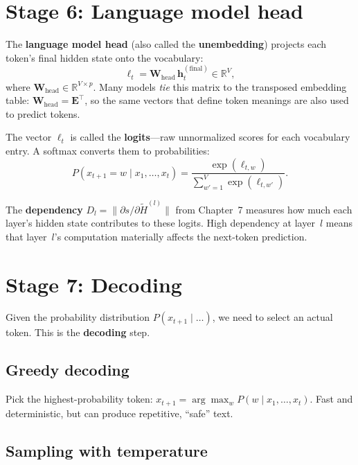 \documentclass[11pt, twoside, openright]{memoir}
\begin{document}
\section{Stage 6: Language model head}

The \textbf{language model head} (also called the \textbf{unembedding})
projects each token's final hidden state onto the vocabulary:
\[
  \boldsymbol{\ell}_t = \mathbf{W}_{\text{head}} \, \mathbf{h}^{(\text{final})}_t
  \in \mathbb{R}^V,
\]
where $\mathbf{W}_{\text{head}} \in \mathbb{R}^{V \times p}$.  Many models
\emph{tie} this matrix to the transposed embedding table:
$\mathbf{W}_{\text{head}} = \mathbf{E}^\top$, so the same vectors that
define token meanings are also used to predict tokens.

The vector $\boldsymbol{\ell}_t$ is called the \textbf{logits}---raw
unnormalized scores for each vocabulary entry.  A softmax converts them to
probabilities:
\[
  P(x_{t+1} = w \mid x_1, \ldots, x_t) =
  \frac{\exp(\ell_{t,w})}{\sum_{w'=1}^{V} \exp(\ell_{t,w'})}.
\]

\begin{keyidea}
The \textbf{dependency} $D_l = \|\partial s / \partial \tilde{H}^{(l)}\|$
from Chapter~7 measures how much each layer's hidden state contributes to
these logits.  High dependency at layer~$l$ means that layer~$l$'s
computation materially affects the next-token prediction.
\end{keyidea}

\section{Stage 7: Decoding}

Given the probability distribution $P(x_{t+1} \mid \ldots)$, we need to
select an actual token.  This is the \textbf{decoding} step.

\subsection{Greedy decoding}

Pick the highest-probability token:
$x_{t+1} = \arg\max_w P(w \mid x_1, \ldots, x_t)$.
Fast and deterministic, but can produce repetitive, ``safe'' text.

\subsection{Sampling with temperature}
\end{document}
